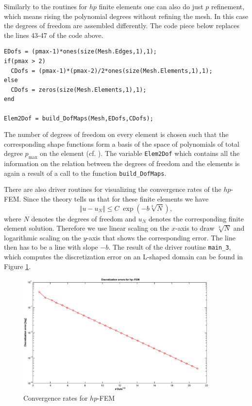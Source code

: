 Similarly to the routines for $hp$ finite elements one can also do just $p$ refinement, which means rising the polynomial degrees without refining the mesh. In this case the degrees of freedom are assembled differently. The code piece below replaces the lines 43-47 of the code above.

\begin{lstlisting}
EDofs = (pmax-1)*ones(size(Mesh.Edges,1),1);
if(pmax > 2)
  CDofs = (pmax-1)*(pmax-2)/2*ones(size(Mesh.Elements,1),1);
else
  CDofs = zeros(size(Mesh.Elements,1),1);
end

Elem2Dof = build_DofMaps(Mesh,EDofs,CDofs);  
\end{lstlisting}

The number of degrees of freedom on every element is chosen such that the corresponding shape functions form a basis of the space of polynomials of total degree $p_\text{max}$ on the element (cf. \cite{S04}). The variable \texttt{Elem2Dof} which contains all the information on the relation between the degrees of freedom and the elements is again a result of a call to the function \texttt{build\_DofMaps}.

There are also driver routines for visualizing the convergence rates of the $hp$-FEM. Since the theory tells us that for these finite elements we have
\begin{equation}
 \Vert u-u_N \Vert \leq C \; \exp(-b\sqrt[3]{N}),
\end{equation}
where $N$ denotes the degrees of freedom and $u_N$ denotes the corresponding finite element solution. Therefore we use linear scaling on the $x$-axis to draw $\sqrt[3]{N}$ and logarithmic scaling on the $y$-axis that shows the corresponding error. The line then has to be a line with slope $-b$. The result of the driver routine \texttt{main\_3}, which computes the discretization error on an L-shaped domain can be found in Figure \ref{fig:hp}.

\begin{figure}[htb]
  \centering
  \includegraphics[width=0.9\textwidth]{hp.eps}
  \caption{Convergence rates for $hp$-FEM}
  \label{fig:hp}
\end{figure}



